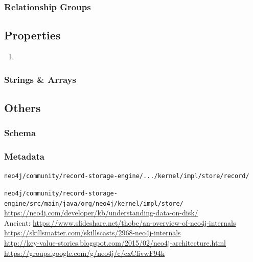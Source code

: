 \documentclass[a4paper,10pt]{article}
\begin{document}
        \subsubsection{Relationship Groups}

    \subsection{Properties}
    \begin{enumerate}
     \item 
    \end{enumerate}
    
    \subsubsection{Strings \& Arrays}
    
    
    \subsection{Others}
        \subsubsection{Schema}
        \subsubsection{Metadata}

\texttt{neo4j/community/record-storage-engine/.../kernel/impl/store/record/}

\texttt{neo4j/community/record-storage-engine/src/main/java/org/neo4j/kernel/impl/store/} \\

\href{Layout N4J}{https://neo4j.com/developer/kb/understanding-data-on-disk/} \\

Ancient: \href{Slides: Internals Of N4J}{https://www.slideshare.net/thobe/an-overview-of-neo4j-internals} \\
\href{Video}{https://skillsmatter.com/skillscasts/2968-neo4j-internals} \\

\href{N4J Arch blog}{http://key-value-stories.blogspot.com/2015/02/neo4j-architecture.html} \\

\href{Followup discussion w devs}{https://groups.google.com/g/neo4j/c/cxClivwF94k}
\end{document}
